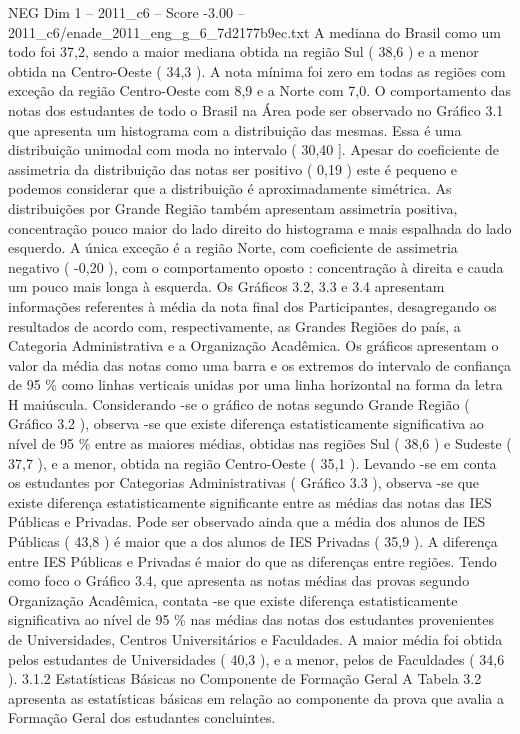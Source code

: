 \begin{textsample}{NEG Dim 1 – 2011\_c6 – Score -3.00 – 2011\_c6/enade\_2011\_eng\_g\_6\_7d2177b9ec.txt}
A mediana do Brasil como um todo foi 37,2, sendo a maior mediana obtida na região Sul ( 38,6 ) e a menor obtida na Centro-Oeste ( 34,3 ).
A nota mínima foi zero em todas as regiões com exceção da região Centro-Oeste com 8,9 e a Norte com 7,0.
O comportamento das notas dos estudantes de todo o Brasil na Área pode ser observado no Gráfico 3.1 que apresenta um histograma com a distribuição das mesmas.
Essa é uma distribuição unimodal com moda no intervalo ( 30,40 ].
Apesar do coeficiente de assimetria da distribuição das notas ser positivo ( 0,19 ) este é pequeno e podemos considerar que a distribuição é aproximadamente simétrica.
As distribuições por Grande Região também apresentam assimetria positiva, concentração pouco maior do lado direito do histograma e mais espalhada do lado esquerdo.
A única exceção é a região Norte, com coeficiente de assimetria negativo ( -0,20 ), com o comportamento oposto : concentração à direita e cauda um pouco mais longa à esquerda.
Os Gráficos 3.2, 3.3 e 3.4 apresentam informações referentes à média da nota final dos Participantes, desagregando os resultados de acordo com, respectivamente, as Grandes Regiões do país, a Categoria Administrativa e a Organização Acadêmica.
Os gráficos apresentam o valor da média das notas como uma barra e os extremos do intervalo de confiança de 95 \% como linhas verticais unidas por uma linha horizontal na forma da letra H maiúscula.
Considerando -se o gráfico de notas segundo Grande Região ( Gráfico 3.2 ), observa -se que existe diferença estatisticamente significativa ao nível de 95 \% entre as maiores médias, obtidas nas regiões Sul ( 38,6 ) e Sudeste ( 37,7 ), e a menor, obtida na região Centro-Oeste ( 35,1 ).
Levando -se em conta os estudantes por Categorias Administrativas ( Gráfico 3.3 ), observa -se que existe diferença estatisticamente significante entre as médias das notas das IES Públicas e Privadas.
Pode ser observado ainda que a média dos alunos de IES Públicas ( 43,8 ) é maior que a dos alunos de IES Privadas ( 35,9 ).
A diferença entre IES Públicas e Privadas é maior do que as diferenças entre regiões.
Tendo como foco o Gráfico 3.4, que apresenta as notas médias das provas segundo Organização Acadêmica, contata -se que existe diferença estatisticamente significativa ao nível de 95 \% nas médias das notas dos estudantes provenientes de Universidades, Centros Universitários e Faculdades.
A maior média foi obtida pelos estudantes de Universidades ( 40,3 ), e a menor, pelos de Faculdades ( 34,6 ). 3.1.2 Estatísticas Básicas no Componente de Formação Geral A Tabela 3.2 apresenta as estatísticas básicas em relação ao componente da prova que avalia a Formação Geral dos estudantes concluintes.

\end{textsample}
